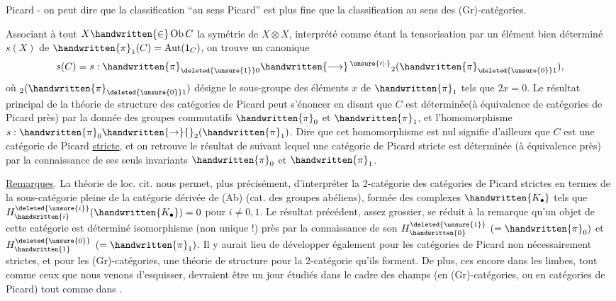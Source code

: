 
Picard - on peut dire que la classification ``au sens Picard'' est plus fine que la classification au sens des (Gr)-catégories. 

Associant à tout $X\handwritten{\in}\operatorname{Ob}C$ la symétrie de $X\otimes X$, interprété comme  étant la tensorisation par un élément bien déterminé $s(X)$ de $\handwritten{\pi}_1(C)=\operatorname{Aut}(1_C)$, on trouve un  canonique
\[
s(C)=s:\handwritten{\pi}_{\deleted{\unsure{1}}0}\handwritten{\longrightarrow}\,{}^{\unsure{\prime|\cdot}}{}_2(\handwritten{\pi}_{\deleted{\unsure{0}}1}),
\]
où $ {}_2(\handwritten{\pi}_{\deleted{\unsure{0}}1})$ désigne le sous-groupe des éléments $x$ de $\handwritten{\pi}_1$ tels que $2x=0$. Le résultat principal de la théorie de structure des catégories de Picard peut s'énoncer en disant que $C$ est déterminée(à équivalence  de catégories de Picard près) par la donnée des groupes commutatifs $\handwritten{\pi}_0$ et $\handwritten{\pi}_1$, et l'homomorphisme $s:\handwritten{\pi}_0\handwritten{\to}{}_2(\handwritten{\pi}_1)$. Dire que cet homomorphisme est nul signifie d'ailleurs que $C$ est une catégorie de Picard \uline{stricte}, et on retrouve le résultat de \handwritten{[~]} suivant lequel une catégorie de Picard stricte est déterminée (à équivalence près) par la connaissance de ses seuls invariants $\handwritten{\pi}_0$ et $\handwritten{\pi}_1$.

\uline{Remarques}. La théorie de loc. cit. nous permet, plus précisément, d'interpréter la 2-catégorie des catégories de Picard strictes en termes de la sous-catégorie pleine de la catégorie dérivée de (Ab) (cat. des groupes abéliens), formée des complexes $\handwritten{K_{\bullet}}$ tels que $H^{\deleted{\unsure{i}}}_{\handwritten{i}}(\handwritten{K_{\bullet}})=0$ pour $i\ne0,1$. Le résultat précédent, assez grossier, se réduit  à la remarque qu'un objet de cette catégorie est déterminé  isomorphisme (non unique !) près par la connaissance de son $H^{\deleted{\unsure{1}}}_{\handwritten{0}}$ $(=\handwritten{\pi}_0)$ et $H^{\deleted{\unsure{0}}}_{\handwritten{1}}$ $(=\handwritten{\pi}_1)$. Il y aurait lieu de développer également pour les catégories de Picard non nécessairement strictes, et pour les (Gr)-catégories, une théorie de structure pour la 2-catégorie qu'ils forment. De plus, ces  encore dans les limbes, tout comme ceux que  nous venons d'esquisser, devraient être un jour  étudiés dans le cadre des champs (en (Gr)-catégories, ou en catégories de Picard) tout comme dans \handwritten{[~]}.

